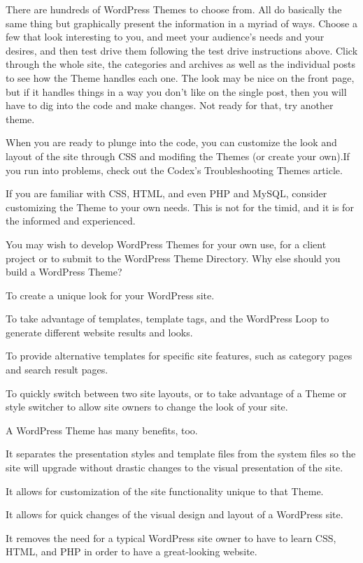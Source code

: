 There are hundreds of WordPress Themes to choose from. All do basically the same thing but graphically present the information in a myriad of ways. Choose a few that look interesting to you, and meet your audience's needs and your desires, and then test drive them following the test drive instructions above. Click through the whole site, the categories and archives as well as the individual posts to see how the Theme handles each one. The look may be nice on the front page, but if it handles things in a way you don't like on the single post, then you will have to dig into the code and make changes. Not ready for that, try another theme.

When you are ready to plunge into the code, you can customize the look and layout of the site through CSS and modifing the Themes (or create your own).If you run into problems, check out the Codex's Troubleshooting Themes article.

If you are familiar with CSS, HTML, and even PHP and MySQL, consider customizing the Theme to your own needs. This is not for the timid, and it is for the informed and experienced. 

You may wish to develop WordPress Themes for your own use, for a client project or to submit to the WordPress Theme Directory. Why else should you build a WordPress Theme?

\begin{compactitem}
\item To create a unique look for your WordPress site.
\item To take advantage of templates, template tags, and the WordPress Loop to generate different website results and looks.
\item To provide alternative templates for specific site features, such as category pages and search result pages.
\item To quickly switch between two site layouts, or to take advantage of a Theme or style switcher to allow site owners to change the look of your site.
\end{compactitem}



A WordPress Theme has many benefits, too.

\begin{compactitem}
\item It separates the presentation styles and template files from the system files so the site will upgrade without drastic changes to the visual presentation of the site.
\item It allows for customization of the site functionality unique to that Theme.
\item It allows for quick changes of the visual design and layout of a WordPress site.
\item It removes the need for a typical WordPress site owner to have to learn CSS, HTML, and PHP in order to have a great-looking website.
\end{compactitem}

